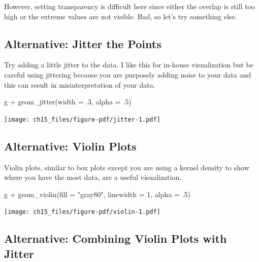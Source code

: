 \documentclass[
  letterpaper,
  DIV=11,
  numbers=noendperiod]{scrreprt}
\newenvironment{Shaded}{\begin{snugshade}}{\end{snugshade}}
\newcommand{\AttributeTok}[1]{\textcolor[rgb]{0.40,0.45,0.13}{#1}}
\newcommand{\DecValTok}[1]{\textcolor[rgb]{0.68,0.00,0.00}{#1}}
\newcommand{\FunctionTok}[1]{\textcolor[rgb]{0.28,0.35,0.67}{#1}}
\newcommand{\NormalTok}[1]{\textcolor[rgb]{0.00,0.23,0.31}{#1}}
\newcommand{\SpecialCharTok}[1]{\textcolor[rgb]{0.37,0.37,0.37}{#1}}
\newcommand{\StringTok}[1]{\textcolor[rgb]{0.13,0.47,0.30}{#1}}
\begin{document}
However, setting transparency is difficult here since either the overlap
is still too high or the extreme values are not visible. Bad, so let's
try something else.

\subsection{Alternative: Jitter the
Points}\label{alternative-jitter-the-points}

Try adding a little jitter to the data. I like this for in-house
visualization but be careful using jittering because you are purposely
adding noise to your data and this can result in misinterpretation of
your data.

\begin{Shaded}
\begin{Highlighting}[]
\NormalTok{g }\SpecialCharTok{+} \FunctionTok{geom\_jitter}\NormalTok{(}\AttributeTok{width =}\NormalTok{ .}\DecValTok{3}\NormalTok{, }\AttributeTok{alpha =}\NormalTok{ .}\DecValTok{5}\NormalTok{)}
\end{Highlighting}
\end{Shaded}

\texttt{[image: ch15\_files/figure-pdf/jitter-1.pdf]}

\subsection{Alternative: Violin Plots}\label{alternative-violin-plots}

Violin plots, similar to box plots except you are using a kernel density
to show where you have the most data, are a useful visualization.

\begin{Shaded}
\begin{Highlighting}[]
\NormalTok{g }\SpecialCharTok{+} \FunctionTok{geom\_violin}\NormalTok{(}\AttributeTok{fill =} \StringTok{"gray80"}\NormalTok{, }\AttributeTok{linewidth =} \DecValTok{1}\NormalTok{, }\AttributeTok{alpha =}\NormalTok{ .}\DecValTok{5}\NormalTok{)}
\end{Highlighting}
\end{Shaded}

\texttt{[image: ch15\_files/figure-pdf/violin-1.pdf]}

\subsection{Alternative: Combining Violin Plots with
Jitter}\label{alternative-combining-violin-plots-with-jitter}
\end{document}
